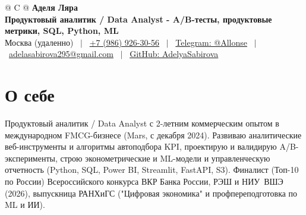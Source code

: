\documentclass[a4paper,10pt]{article}
\begin{document}
\pagestyle{empty}

\begin{tabularx}{\linewidth}{@{} C @{}}
{\bfseries\huge Аделя Ляра} \\[3pt]
{\bfseries\normalsize Продуктовый аналитик / Data Analyst - A/B-тесты, продуктовые метрики, SQL, Python, ML} \\[3pt]
{\small Москва (удаленно) \ $|$ \
\href{tel:+79869263056}{+7 (986) 926-30-56} \ $|$ \
\href{https://t.me/Allonse}{Telegram: @Allonse} \ $|$ \
\href{mailto:adelasabirova295@gmail.com}{adelasabirova295@gmail.com} \ $|$ \
\href{https://github.com/AdelyaSabirova}{GitHub: AdelyaSabirova}} \\
\end{tabularx}

\section{О себе}
Продуктовый аналитик / Data Analyst с 2-летним коммерческим опытом в международном FMCG-бизнесе (Mars, с декабря 2024). Развиваю аналитические веб-инструменты и алгоритмы автоподбора KPI, проектирую и валидирую A/B-эксперименты, строю эконометрические и ML-модели и управленческую отчетность (Python, SQL, Power BI, Streamlit, FastAPI, S3). Финалист (Топ-10 по России) Всероссийского конкурса ВКР Банка России, РЭШ и \mbox{НИУ ВШЭ} (2026), выпускница \mbox{РАНХиГС} ("Цифровая экономика" и профпереподготовка по ML и ИИ).
\end{document}
